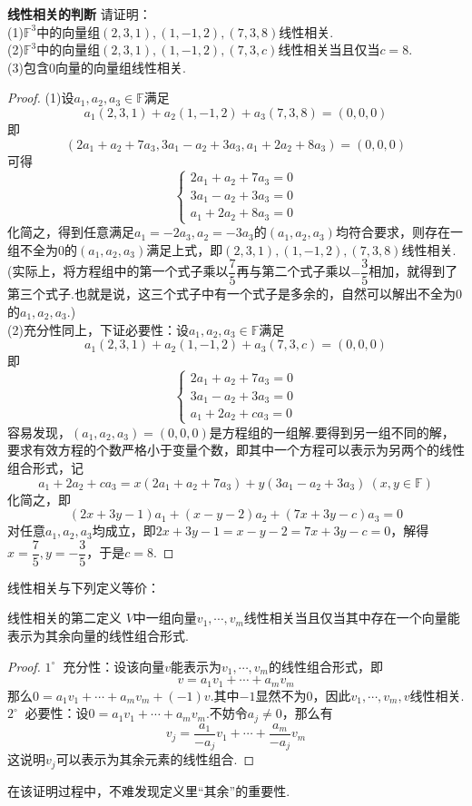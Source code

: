 \documentclass[lang=cn, zihao=5]{elegantbook}
\newcommand{\F}{\mathbb{F}}
\newcommand{\buzhou}[1]{$#1^{\circ} \ $}
\newcommand{\examplefont}[1]{\color{mgreen} \textbf{#1}}
\begin{document}
\begin{example}{\examplefont{线性相关的判断}}
	请证明： \\
	(1)$\F ^{3}$中的向量组$(2,3,1),(1,-1,2),(7,3,8)$线性相关. \\
	(2)$\F ^{3}$中的向量组$(2,3,1),(1,-1,2),(7,3,c)$线性相关当且仅当$c=8$. \\
	(3)包含$0$向量的向量组线性相关.
\end{example}

\begin{proof}
	(1)设$a_1,a_2,a_3 \in \F$满足$$a_1(2,3,1)+a_2(1,-1,2)+a_3(7,3,8)=(0,0,0)$$
	即$$(2a_1+a_2+7a_3,3a_1-a_2+3a_3,a_1+2a_2+8a_3)=(0,0,0)$$
	可得$$\begin{cases}
		2a_1+a_2+7a_3=0 \\
		3a_1-a_2+3a_3=0 \\
		a_1+2a_2+8a_3=0
	\end{cases}$$
	化简之，得到任意满足$a_1=-2a_3,a_2=-3a_3$的$(a_1,a_2,a_3)$均符合要求，则存在一组不全为$0$的$(a_1,a_2,a_3)$满足上式，即$(2,3,1),(1,-1,2),(7,3,8)$线性相关. \\
	(实际上，将方程组中的第一个式子乘以$\dfrac{7}{5}$再与第二个式子乘以$-\dfrac{3}{5}$相加，就得到了第三个式子.也就是说，这三个式子中有一个式子是多余的，自然可以解出不全为$0$的$a_1,a_2,a_3$.) \\
	(2)充分性同上，下证必要性：设$a_1,a_2,a_3 \in \F$满足$$a_1(2,3,1)+a_2(1,-1,2)+a_3(7,3,c)=(0,0,0)$$
	即$$\begin{cases}
		2a_1+a_2+7a_3=0 \\
		3a_1-a_2+3a_3=0 \\
		a_1+2a_2+ca_3=0
	\end{cases}$$
	容易发现，$(a_1,a_2,a_3)=(0,0,0)$是方程组的一组解.要得到另一组不同的解，要求有效方程的个数严格小于变量个数，即其中一个方程可以表示为另两个的线性组合形式，记$$a_1+2a_2+ca_3=x(2a_1+a_2+7a_3)+y(3a_1-a_2+3a_3)~(x,y \in \F )$$
	化简之，即$$(2x+3y-1)a_1+(x-y-2)a_2+(7x+3y-c)a_3=0$$
	对任意$a_1,a_2,a_3$均成立，即$2x+3y-1=x-y-2=7x+3y-c=0$，解得$x=\dfrac{7}{5},y=-\dfrac{3}{5}$，于是$c=8$.
\end{proof}

线性相关与下列定义等价：

\begin{proposition}{线性相关的第二定义}
	$V$中一组向量$v_1, \cdots ,v_m$线性相关当且仅当其中存在一个向量能表示为其余向量的线性组合形式.
\end{proposition}
\begin{proof}
	\buzhou{1} 充分性：设该向量$v$能表示为$v_1, \cdots ,v_m$的线性组合形式，即$$v= a_1v_1 + \cdots + a_mv_m$$
	那么$0=a_1v_1 + \cdots + a_mv_m + (-1)v$.其中$-1$显然不为$0$，因此$v_1, \cdots ,v_m,v$线性相关. \\
	\buzhou{2} 必要性：设$0=a_1v_1 + \cdots + a_mv_m$.不妨令$a_j \neq 0$，那么有$$v_j = \frac{a_1}{-a_j} v_1 + \cdots + \frac{a_m}{-a_j} v_m$$
	这说明$v_j$可以表示为其余元素的线性组合.
\end{proof}
\begin{remark}
	在该证明过程中，不难发现定义里“其余”的重要性.
\end{remark}
\end{document}
